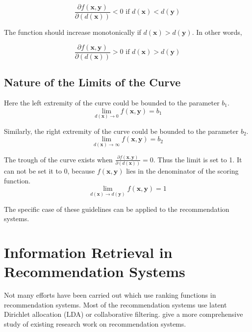 \documentclass[11pt]{article}
\begin{document}
	\begin{equation} \label{c2}
		\frac{\partial f(\mathbf{x}, \mathbf{y})}{\partial ( d(\mathbf{x}) )} < 0 \text{ if } d(\mathbf{x}) < d(\mathbf{y})
	\end{equation}
	
	The function should increase monotonically if $d(\mathbf{x}) > d(\mathbf{y})$. In other words,
	
	\begin{equation} \label{c3}
		\frac{\partial f(\mathbf{x}, \mathbf{y})}{\partial ( d(\mathbf{x}) )} > 0 \text{ if } d(\mathbf{x}) > d(\mathbf{y})
	\end{equation}
	
	\subsection{Nature of the Limits of the Curve}
	
	Here the left extremity of the curve could be bounded to the parameter $b_1$.
	\begin{equation} \label{c4}
		\lim_{d(\mathbf{x})\to 0} f(\mathbf{x}, \mathbf{y}) = b_1
	\end{equation}
	
	Similarly, the right extremity of the curve could be bounded to the parameter $b_2$.
	\begin{equation} \label{c5}
		\lim_{d(\mathbf{x})\to \infty} f(\mathbf{x}, \mathbf{y}) = b_2
	\end{equation}
	
	The trough of the curve exists when $\frac{\partial f(\mathbf{x}, \mathbf{y})}{\partial ( d(\mathbf{x}) )} = 0$. Thus the limit is set to 1. It can not be set it to 0, because $f(\mathbf{x}, \mathbf{y})$ lies in the denominator of the scoring function.
	\begin{equation} \label{c6}
		\lim_{d(\mathbf{x})\to d(\mathbf{y})} f(\mathbf{x}, \mathbf{y}) = 1
	\end{equation}
	
	The specific case of these guidelines can be applied to the recommendation systems.
	
	\section{Information Retrieval in Recommendation Systems}
	
	Not many efforts have been carried out which use ranking functions in recommendation systems. Most of the recommendation systems use latent Dirichlet allocation (LDA) or collaborative filtering.   give a more comprehensive study of existing research work on recommendation systems. 
	
\end{document}
